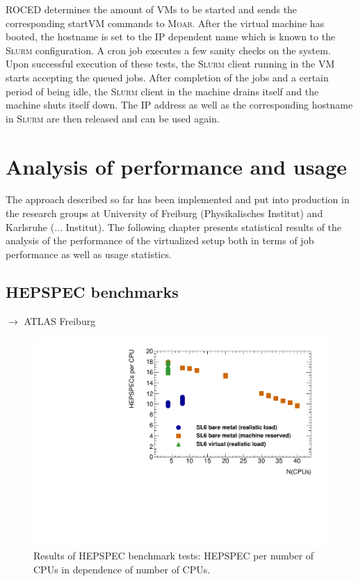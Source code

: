ROCED determines the amount of VMs to be started and sends the
corresponding startVM commands to \textsc{Moab}.
After the virtual machine has booted, the hostname is set to the IP
dependent name which is known to the \textsc{Slurm} configuration.
A cron job executes a few sanity
checks on the system.
Upon successful execution of these tests, the \textsc{Slurm} client
running in the VM starts accepting the queued jobs.
After completion of the jobs and a certain period of being idle, the
\textsc{Slurm} client in the machine drains itself and the machine
shuts itself down.
The IP address as well as the corresponding hostname in \textsc{Slurm}
are then released and can be used again.








\section{Analysis of performance and usage}

The approach described so far has been implemented and put into
production in the research groups at University of Freiburg
(Physikalisches Institut) and Karlsruhe (... Institut).
The following chapter presents statistical results of the analysis of
the performance of the virtualized setup both in terms of job
performance as well as usage statistics.


\subsection{HEPSPEC benchmarks}
$\to$ ATLAS Freiburg
\begin{figure}[htbp]
  \includegraphics[width=\columnwidth]{figures/HEPSPECpCPUvsCPU.pdf}
\caption{Results of HEPSPEC benchmark tests: HEPSPEC per number of
  CPUs in dependence of number of CPUs.}
\label{fig:HEPSPECpCPUvsCPU-atlas}
\end{figure}





